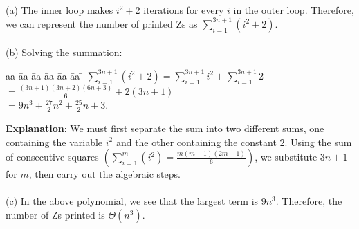 \documentclass{article}
\begin{document}
\begin{problem}
\begin{solution}
\\ \\ (a) The inner loop makes $i^2+2$ iterations for every $i$ in the outer loop. Therefore, we can represent the number of printed Zs as  $\sum_{i=1}^{3n+1} (i^2+2)$. \\
\\ (b) Solving the summation: 
\begin{tabbing}
aa \= aa \= aa \= aa \= aa \= aa \= \kill
$\sum_{i=1}^{3n+1} (i^2+2)  = \sum_{i=1}^{3n+1} i^2 +  \sum_{i=1}^{3n+1} 2$\\
\> \> \> \> \> $= \frac{(3n+1)(3n+2)(6n+3)}{6} + 2(3n+1)$ \\
\> \> \> \> \> $= 9n^3 + \frac{27}{2}n^2 + \frac{25}{2}n + 3$. \\
\end{tabbing}
\textbf{Explanation}: We must first separate the sum into two different sums, one containing the variable $i^2$ and the other containing the constant $2$. Using the sum of consecutive squares $(\sum_{i=1}^{m} (i^2) = \frac{m(m+1)(2m+1)}{6})$, we substitute $3n+1$ for $m$, then carry out the algebraic steps. \\
\\ (c) In the above polynomial, we see that the largest term is $9n^3$. Therefore, the number of Zs printed is $\Theta(n^3)$. \\
\end{solution}

\end{problem}

\end{document}
